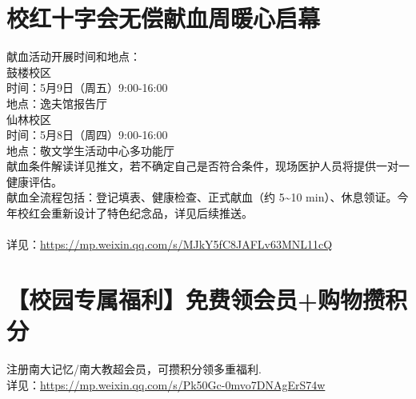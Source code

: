 \documentclass[letterpaper, 12pt]{article}
\begin{document}
\begin{multicols}{2}
\section{校红十字会无偿献血周暖心启幕} %
献血活动开展时间和地点：
\\鼓楼校区
\\时间：5月9日（周五）9:00-16:00 
\\地点：逸夫馆报告厅
\\仙林校区
\\时间：5月8日（周四）9:00-16:00 
\\地点：敬文学生活动中心多功能厅
\\献血条件解读详见推文，若不确定自己是否符合条件，现场医护人员将提供一对一健康评估。
\\献血全流程包括：登记填表、健康检查、正式献血（约 5\textasciitilde{}10 min）、休息领证。今年校红会重新设计了特色纪念品，详见后续推送。
\\
\\详见：\url{https://mp.weixin.qq.com/s/MJkY5fC8JAFLv63MNL11cQ}

\section{【校园专属福利】免费领会员+购物攒积分} %
注册南大记忆/南大教超会员，可攒积分领多重福利.
\\详见：\url{https://mp.weixin.qq.com/s/Pk50Gc-0mvo7DNAgErS74w}


\end{multicols}
\end{document}

